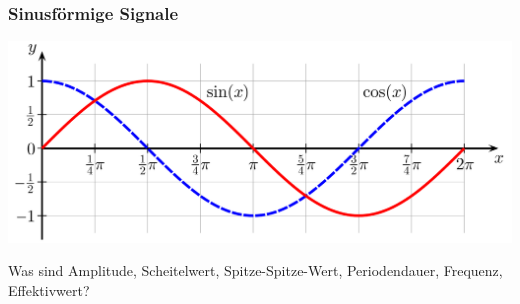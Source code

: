 \begin{frame}
  \frametitle{Sinusförmige Signale}

  \begin{center}
    \includegraphics[width=1\textwidth]{a11/Sine_cosine_one_period.png}
    \tiny \hyperlink{refs}{\cite{wc}}
  \end{center}

  Was sind Amplitude, Scheitelwert, Spitze-Spitze-Wert, Periodendauer,
  Frequenz, Effektivwert?

\end{frame}

